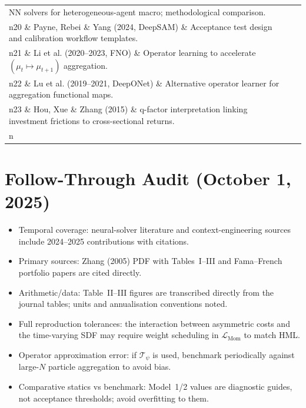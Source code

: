 \documentclass[11pt,a4paper]{article}
\numberwithin{equation}{section}
\begin{document}
\begin{tabularx}{\textwidth}{>{\raggedright\arraybackslash}p{1.2em} >{\raggedright\arraybackslash}p{} X}
NN solvers for heterogeneous-agent macro; methodological comparison. \\n20 \& Payne, Rebei \& Yang (2024, DeepSAM) \& Acceptance test design and calibration workflow templates. \\n21 \& Li et al. (2020--2023, FNO) \& Operator learning to accelerate $(\mu_t \mapsto \mu_{t+1})$ aggregation. \\n22 \& Lu et al. (2019--2021, DeepONet) \& Alternative operator learner for aggregation functional maps. \\n23 \& Hou, Xue \& Zhang (2015) \& q-factor interpretation linking investment frictions to cross-sectional returns. \\n\bottomrule
\end{tabularx}
\normalsize

\section{Follow-Through Audit (October 1, 2025)}
\begin{diagnosticbox}[title={Coverage and Evidence Checks}]
\begin{itemize}
  \item Temporal coverage: neural-solver literature and context-engineering sources include 2024--2025 contributions with citations.
  \item Primary sources: Zhang (2005) PDF with Tables~I--III and Fama--French portfolio papers are cited directly.
  \item Arithmetic/data: Table~II--III figures are transcribed directly from the journal tables; units and annualisation conventions noted.
\end{itemize}
\end{diagnosticbox}

\begin{diagnosticbox}[title={What Might Still Be Fragile / Blind Spots}]
\begin{itemize}
  \item Full reproduction tolerances: the interaction between asymmetric costs and the time-varying SDF may require weight scheduling in $\mathcal L_{\text{Mom}}$ to match HML.
  \item Operator approximation error: if $\mathcal T_{\psi}$ is used, benchmark periodically against large-$N$ particle aggregation to avoid bias.
  \item Comparative statics vs benchmark: Model~1/2 values are diagnostic guides, not acceptance thresholds; avoid overfitting to them.
\end{itemize}
\end{diagnosticbox}
\end{document}
